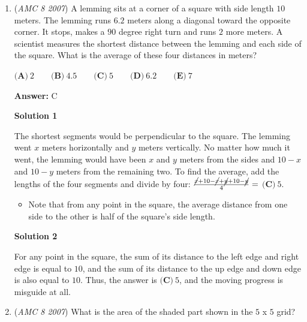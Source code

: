 \begin{enumerate}
 After choosing any letter, there are seven cards left. Three of them will make a winning pair, so the probability is $\frac37$.

 Now that we have the probability for both cases, we can add them: $\frac17+\frac37=\boxed{\textbf{(D)} \frac47}$.

 


	\item (\textit{AMC 8 2007}) A lemming sits at a corner of a square with side length $10$ meters. The lemming
runs $6.2$ meters along a diagonal toward the opposite corner. It stops, makes
a $90$ degree right turn and runs $2$ more meters. A scientist measures the shortest
distance between the lemming and each side of the square. What is the average
of these four distances in meters?


 $\textbf{(A)}\ 2 \qquad \textbf{(B)}\ 4.5 \qquad \textbf{(C)}\ 5 \qquad \textbf{(D)}\ 6.2 \qquad \textbf{(E)}\ 7$

 \textbf{Answer: }C



\textbf{Solution 1}

The shortest segments would be perpendicular to the square. The lemming went $x$ meters horizontally and $y$ meters vertically. No matter how much it went, the lemming would have been $x$ and $y$ meters from the sides and $10-x$ and $10-y$ meters from the remaining two. To find the average, add the lengths of the four segments and divide by four: $\frac {\cancel{x}+10-\cancel{x}+\cancel{y}+10-\cancel{y}}{4} =$ $\boxed{\textbf{(C)}\ 5}$.

 
            \begin{itemize}
        \item Note that from any point in the square, the average distance from one side to the other is half of the square's side length.
            \end{itemize}
            



\textbf{Solution 2}

For any point in the square, the sum of its distance to the left edge and right edge is equal to $10$, and the sum of its distance to the up edge and down edge is also equal to $10$. Thus, the answer is $\boxed{\textbf{(C)}\ 5}$, and the moving progress is misguide at all.

 


	\item (\textit{AMC 8 2007}) What is the area of the shaded part shown in the $5$ x $5$ grid?



\end{enumerate}
